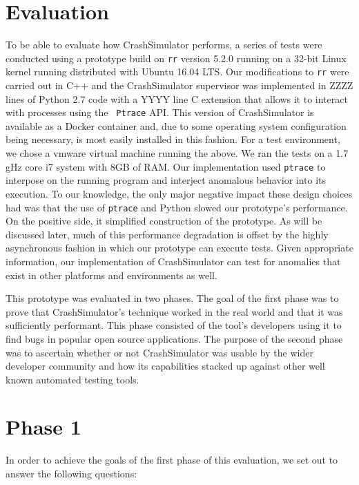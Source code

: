 \section{Evaluation}
\label{SEC:evaluation}

To be able to evaluate how CrashSimulator performs, a series of tests were
conducted using a prototype build on {\tt rr} version 5.2.0 running on a
32-bit Linux kernel running distributed with  Ubuntu 16.04 LTS.  Our
modifications to {\tt rr} were carried out in C++ and the CrashSimulator
supervisor was implemented in ZZZZ lines of Python 2.7 code with a YYYY
line C extension that allows it to interact with processes using the {\tt
Ptrace} API.  This version of CrashSimulator is available as a Docker
container and, due to some operating system configuration being necessary,
is most easily installed in this fashion.  For a test environment, we chose
a vmware virtual machine running the above.  We ran the tests on a 1.7 gHz
core i7 system with 8GB of RAM. Our implementation used {\tt ptrace} to
interpose on the running program and interject anomalous behavior into its
execution.  To our knowledge, the only major negative impact these design
choices had was that the use of {\tt ptrace} and Python slowed our
prototype's performance.  On the positive side, it simplified construction
of the prototype.  As will be discussed later, much of this performance
degradation is offset by the highly asynchronous fashion in which our
prototype can execute tests. Given appropriate information, our
implementation of CrashSimulator can test for anomalies that exist in other
platforms and environments as well.

This prototype was evaluated in two phases.  The goal of the first phase
was to prove that CrashSimulator's technique worked in the real world and
that it was sufficiently performant.  This phase consisted of
the tool's developers using it to find bugs in popular open
source applications.  The purpose of the second phase was to ascertain
whether or not CrashSimulator was usable by the wider developer community
and how its capabilities stacked up against other well known automated
testing tools.

\section{Phase 1}

In order to achieve the goals of the first phase of this evaluation, we set
out to answer the following questions:

